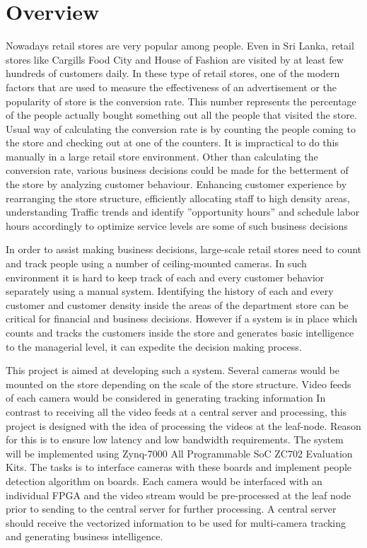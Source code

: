 \documentclass[12pt,a4paper]{report}
\begin{document}
\section{Overview}
Nowadays retail stores are very popular among people. Even in Sri Lanka, retail stores like Cargills Food City and House of Fashion are visited by at least few hundreds of customers daily. In these type of retail stores, one of the modern factors that are used to measure the effectiveness of an advertisement or the popularity of store is the conversion rate. This number represents the percentage of the people actually bought something out all the people that visited the store. Usual way of calculating the conversion rate is by counting the people coming to the store and checking out at one of the counters. It is impractical to do this manually in a large retail store environment. Other than calculating the conversion rate, various business decisions could be made for the betterment of the store by analyzing customer behaviour. Enhancing customer experience by rearranging the store structure, efficiently allocating staff to high density areas, understanding Traffic trends and identify ''opportunity hours'' and schedule labor hours accordingly to optimize service levels  are some of such business decisions 

\par In order to assist making business decisions, large-scale retail stores need to count and
track people using a number of ceiling-mounted cameras. In such environment it is hard to keep track of each and every customer behavior separately using a manual
system. Identifying the history of each and every customer and customer density inside
the areas of the department store can be critical for financial and business decisions. However if a system is in place which counts and tracks the customers inside the store and generates basic intelligence to the managerial level, it can expedite the decision making process.

\par This project is aimed at developing such a system. Several cameras would be mounted on the store depending on the scale of the store structure. Video feeds of each camera would be considered in generating tracking information In contrast to receiving all the
video feeds at a central server and processing, this project is designed with the idea of processing the videos at the leaf-node. Reason for this is to ensure low latency and low bandwidth requirements. The system will be implemented using Zynq-7000 All Programmable
SoC ZC702 Evaluation Kits. The tasks is to interface cameras with these boards and implement people detection algorithm on boards. Each camera would be interfaced with an individual FPGA and the video stream would be pre-processed at the leaf node prior to sending to the central server for further processing.  A central server should receive the vectorized information to be used for multi-camera tracking and generating business
intelligence.
\end{document}
